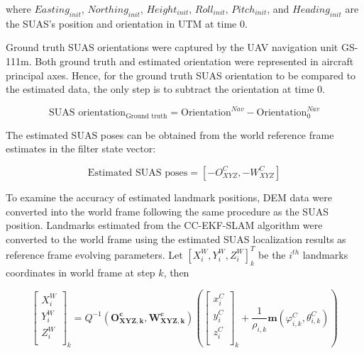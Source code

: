 \noindent where $Easting_{init}$, $Northing_{init}$,
$Height_{init}$, $Roll_{init}$, $Pitch_{init}$, and
$Heading_{init}$ are the SUAS's position and orientation in UTM at time 0. 

Ground truth SUAS orientations were captured by the UAV navigation
unit GS-111m. Both ground truth and estimated orientation were
represented in aircraft principal axes. Hence, for the ground truth
SUAS orientation to be compared to the estimated data, the only step
is to subtract the orientation at time 0.

\begin{equation}\text{SUAS orientation}_{\text{Ground truth}} =
\text{Orientation}^{Nav} - \text{Orientation}^{Nav}_0\end{equation}

The estimated SUAS poses can be obtained from the world reference
frame estimates in the filter state vector:

\begin{equation}
 \text{Estimated SUAS poses} = 
[-O_{XYZ}^{C}, -W_{XYZ}^{C}]
\end{equation}

To examine the accuracy of estimated landmark positions, DEM data were
converted into the world frame following the same procedure as the SUAS
position. Landmarks estimated from the CC-EKF-SLAM algorithm were
converted to the world frame using the estimated SUAS localization results
as reference frame evolving parameters. Let $[X_i^W,Y_i^W,
Z_i^W]^T_k$ be the $i^{th}$ landmarks coordinates in world frame at
step $k$, then

\begin{equation}
  \left[ \begin{array}{c}
    X_{i}^{W}  \\
    Y_{i}^{W}  \\
    Z_{i}^{W}  \\
  \end{array} \right]_k=Q^{-1}(\boldsymbol{O_{XYZ, k}^{c}}, \boldsymbol{W_{XYZ,k}^{c}})\left(\left[
    \begin{array}{c}
      x_{i}^{C} \\
      y_{i}^{C} \\
      z_{i}^{C} \\
    \end{array}
  \right]_k+\frac{1}{\rho _{i,k}}\boldsymbol{m}(\varphi_{i,k}^{C},\theta_{i,k}^{C})\right)
\end{equation}

